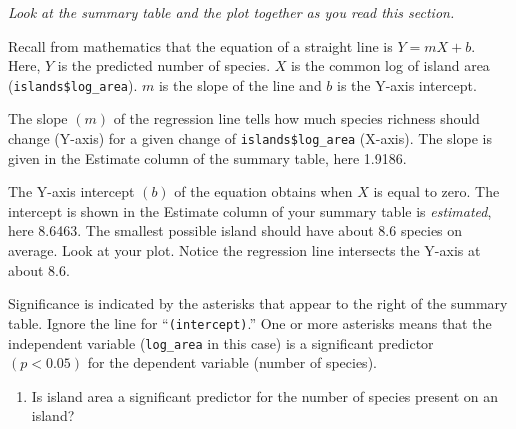 \documentclass[11pt]{article}
\newcommand{\bigSpace}{\vspace{4\baselineskip}}
\begin{document}
\emph{Look at the summary table and the plot together as you read this section.}

Recall from mathematics that the equation of a straight line is $Y = mX + b.$ Here, $Y$ is the predicted number of species. $X$ is the common log of island area (\texttt{islands\$log\_area}).  $m$ is the slope of the line and $b$ is the Y-axis intercept. 

The slope $(m)$ of the regression line tells how much species richness should change (Y-axis) for a given change of \texttt{islands\$log\_area} (X-axis). The slope is given in the Estimate column of the summary table, here 1.9186. 


The Y-axis intercept $(b)$ of the equation obtains when $X$ is equal to zero. The intercept is shown in the Estimate column of your summary table is \emph{estimated}, here 8.6463. The smallest possible island should have about 8.6 species on average. Look at your plot. Notice the regression line intersects the Y-axis at about 8.6.


Significance is indicated by the asterisks that appear to the right of the summary table. Ignore the line for “\texttt{(intercept)}.” One or more asterisks means that the independent variable (\texttt{log\_area} in this case) is a significant predictor $(p < 0.05)$ for the dependent variable (number of species).


\begin{enumerate}[resume]
\item Is island area a significant predictor for the number of species present on an island?

\bigSpace
\end{enumerate}




\end{document}
